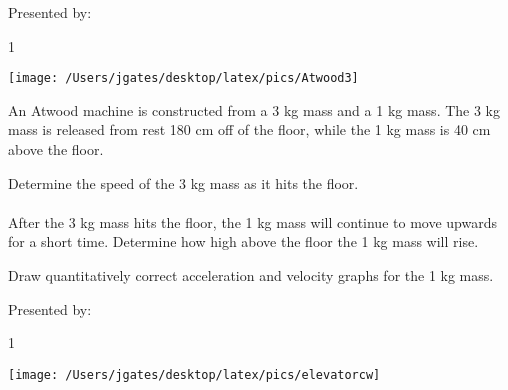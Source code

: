 \AddToShipoutPicture*{\BackgroundPic}


\bigskip
{\large Presented by: }\underline{\hspace{5cm}}




\vfill
\newpage


\AddToShipoutPicture*{\BackgroundPic}

\addtocounter {ProbNum} {1}

\begin{floatingfigure}[r]{.2\textwidth}
\texttt{[image: /Users/jgates/desktop/latex/pics/Atwood3]}
\end{floatingfigure}
 
{\bf \Large{}} An Atwood machine is constructed from a 3 kg mass and a 1 kg mass.  The 3 kg mass is released from rest 180 cm off of the floor, while the 1 kg mass is 40 cm above the floor.

\bigskip
Determine the speed of the 3 kg mass as it hits the floor.
\paragraph{}
\noindent
\vfill

After the 3 kg mass hits the floor, the 1 kg mass will continue to move upwards for a short time.  Determine how high above the floor the 1 kg mass will rise.
\vfill

Draw quantitatively correct acceleration and velocity graphs for the 1 kg mass.
\vfill
\newpage

\AddToShipoutPicture*{\BackgroundPic}


\bigskip
{\large Presented by: }\underline{\hspace{5cm}}




\vfill
\newpage


\AddToShipoutPicture*{\BackgroundPic}

\addtocounter {ProbNum} {1}

\begin{floatingfigure}[r]{.2\textwidth}
\texttt{[image: /Users/jgates/desktop/latex/pics/elevatorcw]}
\end{floatingfigure}
 
